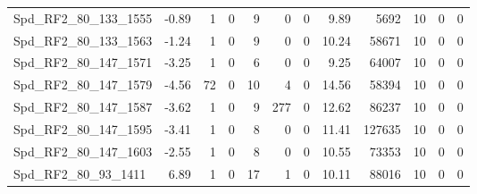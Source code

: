 \begin{longtable}[c]{@{}lrrrrrrrrrrr@{}}
Spd\_RF2\_80\_133\_1555      & -0.89                  & 1                       & 0                       & 9                      & 0                       & 0                       & 9.89                    & 5692                     & 10                       & 0                        & 0                        \\
Spd\_RF2\_80\_133\_1563      & -1.24                  & 1                       & 0                       & 9                      & 0                       & 0                       & 10.24                   & 58671                    & 10                       & 0                        & 0                        \\
Spd\_RF2\_80\_147\_1571      & -3.25                  & 1                       & 0                       & 6                      & 0                       & 0                       & 9.25                    & 64007                    & 10                       & 0                        & 0                        \\
Spd\_RF2\_80\_147\_1579      & -4.56                  & 72                      & 0                       & 10                     & 4                       & 0                       & 14.56                   & 58394                    & 10                       & 0                        & 0                        \\
Spd\_RF2\_80\_147\_1587      & -3.62                  & 1                       & 0                       & 9                      & 277                     & 0                       & 12.62                   & 86237                    & 10                       & 0                        & 0                        \\
Spd\_RF2\_80\_147\_1595      & -3.41                  & 1                       & 0                       & 8                      & 0                       & 0                       & 11.41                   & 127635                   & 10                       & 0                        & 0                        \\
Spd\_RF2\_80\_147\_1603      & -2.55                  & 1                       & 0                       & 8                      & 0                       & 0                       & 10.55                   & 73353                    & 10                       & 0                        & 0                        \\
Spd\_RF2\_80\_93\_1411       & 6.89                   & 1                       & 0                       & 17                     & 1                       & 0                       & 10.11                   & 88016                    & 10                       & 0                        & 0                        \\

\end{longtable}
